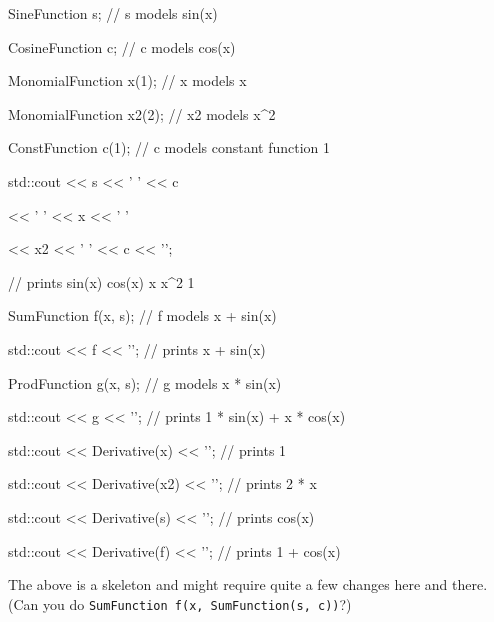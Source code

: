 
\begin{console}

SineFunction s; // s models sin(x)

CosineFunction c; // c models cos(x)

MonomialFunction x(1); // x models x

MonomialFunction x2(2); // x2 models x^2

ConstFunction c(1); // c models constant function 1



std::cout << s << ' ' << c

          << ' ' << x << ' '

          << x2 << ' ' << c << '\n';

// prints sin(x) cos(x) x x^2 1



SumFunction f(x, s); // f models x + sin(x)

std::cout << f << '\n'; // prints x + sin(x)

ProdFunction g(x, s); // g models x * sin(x)

std::cout << g << '\n'; // prints 1 * sin(x) + x * cos(x)



std::cout << Derivative(x) << '\n'; // prints 1

std::cout << Derivative(x2) << '\n'; // prints 2 * x

std::cout << Derivative(s) << '\n'; // prints cos(x)

std::cout << Derivative(f) << '\n'; // prints 1 + cos(x)

\end{console}





The above is a skeleton and might require quite a few changes here and there. (Can you do \verb!SumFunction f(x, SumFunction(s, c))!?)

